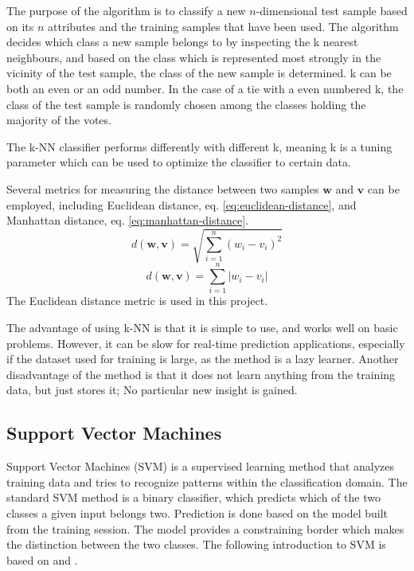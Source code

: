 The purpose of the algorithm is to classify a
new \(n\)-dimensional test sample based on its \(n\) attributes
and the training samples that have been used.
The algorithm decides which class a new sample belongs to by
inspecting the k nearest neighbours,
and based on the class which is represented most strongly in the vicinity
of the test sample,
the class of the new sample is determined.
k can be both an even or an odd number.
In the case of a tie with a even numbered k,
the class of the test sample is randomly chosen among the classes holding
the majority of the votes.

The k-NN classifier performs differently with different k,
meaning k is a tuning parameter which can be used to optimize the classifier
to certain data.

Several metrics for measuring the distance between
two samples \(\mathbf{w}\) and \(\mathbf{v}\) can be employed,
including Euclidean distance, eq. \eqref{eq:euclidean-distance},
and Manhattan distance, eq. \eqref{eq:manhattan-distance}.
\begin{equation}
d(\mathbf{w},\mathbf{v}) = \sqrt{\sum_{i=1}^n (w_i - v_i)^2}
\label{eq:euclidean-distance}
\end{equation}
\begin{equation}
d(\mathbf{w},\mathbf{v}) = \sum_{i=1}^n \left|w_i - v_i\right|
\label{eq:manhattan-distance}
\end{equation}
The Euclidean distance metric is used in this project.

The advantage of using k-NN is that it is simple to use,
and works well on basic problems.
However, it can be slow for real-time prediction applications,
especially if the dataset used for training is large,
as the method is a lazy learner.
Another disadvantage of the method is that it does not
learn anything from the training data, but just stores it;
No particular new insight is gained.
 
\subsection{Support Vector Machines}
\label{sec:svm}
Support Vector Machines (SVM) is a supervised learning
method that analyzes training data 
and tries to recognize patterns within the classification domain.
The standard SVM method is a binary classifier,
which predicts which of the two classes a given input belongs two. 
Prediction is done based on the model built from the training session.
The model provides a constraining border which makes the distinction
between the two classes.
The following introduction to SVM is based on \citep{svmwiki} and \citep{mlwr}.

